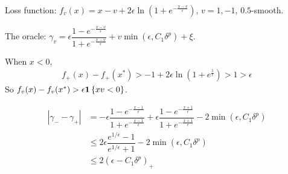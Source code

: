 \documentclass[11pt,letterpaper,english]{article}
\begin{document}
Loss function: $f_v(x) = x-v+2\epsilon \ln\left(1+e^{-\frac{x-v}{\epsilon}}  \right)$, $v= 1, -1$, $0.5$-smooth.

The oracle: $\gamma_v = \epsilon \dfrac{1-e^{-\frac{x-v}{\epsilon}}}{1+e^{-\frac{x-v}{\epsilon}}}+v \min \left( \epsilon, C_1 \delta^p \right)+\xi$.

When $x<0$, 
\begin{align*}
f_+(x)-f_+(x^*) > -1 +2\epsilon \ln\left( 1+e^{\frac{1}{\epsilon}} \right) >1>\epsilon
\end{align*}
So $f_v(x)-f_v(x^*)>\epsilon \mathbf{1}\left\{x v  < 0\right\}$.

\begin{align*}
|\gamma_--\gamma_+| &= -\epsilon \dfrac{1-e^{-\frac{x-1}{\epsilon}}}{1+e^{-\frac{x-1}{\epsilon}}} + \epsilon \dfrac{1-e^{-\frac{x+1}{\epsilon}}}{1+e^{-\frac{x+1}{\epsilon}}}-2 \min \left( \epsilon, C_1 \delta^p \right)\\
&\leq 2\epsilon \dfrac{e^{1/\epsilon}-1}{e^{1/\epsilon}+1}-2 \min \left( \epsilon, C_1 \delta^p \right)\\
&\leq 2\left( \epsilon -C_1\delta^p \right)_+
\end{align*}
\end{document}
